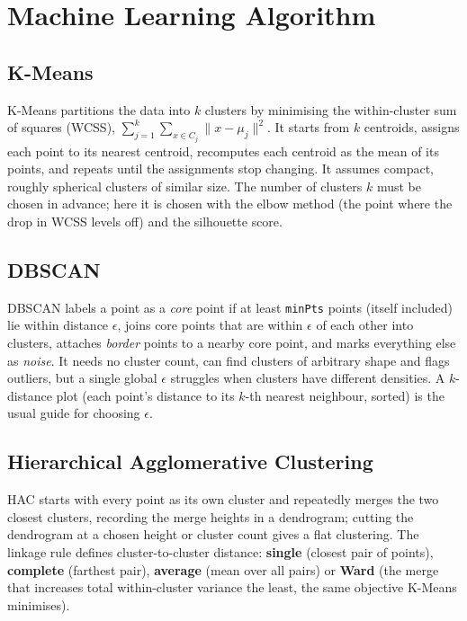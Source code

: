 \documentclass[12pt,a4paper]{article}
\begin{document}
\section{Machine Learning Algorithm}

\subsection*{K-Means}
K-Means partitions the data into $k$ clusters by minimising the within-cluster sum of squares
(WCSS), $\sum_{j=1}^{k}\sum_{x \in C_j}\lVert x - \mu_j \rVert^2$. It starts from $k$ centroids,
assigns each point to its nearest centroid, recomputes each centroid as the mean of its points,
and repeats until the assignments stop changing. It assumes compact, roughly spherical clusters
of similar size. The number of clusters $k$ must be chosen in advance; here it is chosen with the
elbow method (the point where the drop in WCSS levels off) and the silhouette score.

\subsection*{DBSCAN}
DBSCAN labels a point as a \emph{core} point if at least \texttt{minPts} points (itself
included) lie within distance $\epsilon$, joins core points that are within $\epsilon$ of each
other into clusters, attaches \emph{border} points to a nearby core point, and marks everything
else as \emph{noise}. It needs no cluster count, can find clusters of arbitrary shape and flags
outliers, but a single global $\epsilon$ struggles when clusters have different densities. A
$k$-distance plot (each point's distance to its $k$-th nearest neighbour, sorted) is the usual
guide for choosing $\epsilon$.

\subsection*{Hierarchical Agglomerative Clustering}
HAC starts with every point as its own cluster and repeatedly merges the two closest clusters,
recording the merge heights in a dendrogram; cutting the dendrogram at a chosen height or cluster
count gives a flat clustering. The linkage rule defines cluster-to-cluster distance:
\textbf{single} (closest pair of points), \textbf{complete} (farthest pair), \textbf{average}
(mean over all pairs) or \textbf{Ward} (the merge that increases total within-cluster variance
the least, the same objective K-Means minimises).
\end{document}

